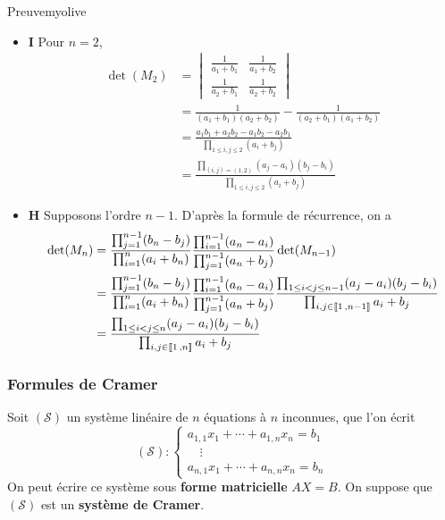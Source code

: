 \begin{demo}{Preuve}{myolive}
\begin{itemize}
            \item \textbf{I} \quad Pour $n = 2$, 
            \begin{align*}
                \det(M_2) 
                &= \begin{vmatrix}
                    \frac{1}{a_1 + b_1} & \frac{1}{a_1 + b_2} \\
                    \frac{1}{a_2 + b_1} & \frac{1}{a_2 + b_2}
                \end{vmatrix} \\
                &= \frac{1}{(a_1 + b_1)(a_2 + b_2)} - \frac{1}{(a_2 + b_1)(a_1 + b_2)} \\
                &= \frac{a_1 b_1 + a_2 b_2 - a_1 b_2 - a_2 b_1}{\prod_{1 \leq i,j \leq 2} (a_i + b_j)} \\
                &= \frac{\prod_{(i,j) = (1,2)} (a_j - a_i)(b_j - b_i)}{\prod_{1 \leq i,j \leq 2} (a_i + b_j)}
            \end{align*}
            \item \textbf{H} \quad Supposons l’ordre $n - 1$. D’après la formule de récurrence, on a
            \begin{align*}
                \operatorname{det}(M_n) 
                &= \frac{\prod_{j=1}^{n-1} (b_n - b_j)}{\prod_{i=1}^n (a_i + b_n)} \frac{\prod_{i=1}^{n-1} (a_n - a_i)}{\prod_{j = 1}^{n-1} (a_n + b_j)} \operatorname{det}(M_{n-1}) \\
                &= \frac{\prod_{j=1}^{n-1} (b_n - b_j)}{\prod_{i=1}^n (a_i + b_n)} \frac{\prod_{i=1}^{n-1} (a_n - a_i)}{\prod_{j = 1}^{n-1} (a_n + b_j)} \frac{\prod_{1 \leq i < j \leq n-1} (a_j - a_i)(b_j - b_i)}{\prod_{i,j \in \left\llbracket 1 \, , n-1 \right\rrbracket} a_i + b_j} \\
                &= \frac{\prod_{1 \leq i < j \leq n} (a_j - a_i)(b_j - b_i)}{\prod_{i,j \in \left\llbracket 1 \, , n \right\rrbracket} a_i + b_j}
            \end{align*}
        \end{itemize}
    \end{demo}

    \subsubsection{Formules de Cramer}

    Soit $(\mathcal{S})$ un système linéaire de $n$ équations à $n$ inconnues, que l’on écrit 
    \[ (\mathcal{S}) : \left\{ \begin{array}{l}
        a_{1,1} x_1 + \cdots + a_{1,n} x_n = b_1 \\
        \quad \vdots \\
        a_{n,1} x_1 + \cdots + a_{n,n} x_n = b_n
    \end{array} \right. \]    
    On peut écrire ce système sous \textbf{forme matricielle} $A X = B$. On suppose que $(\mathcal{S})$ est un \textbf{système de Cramer}. 


